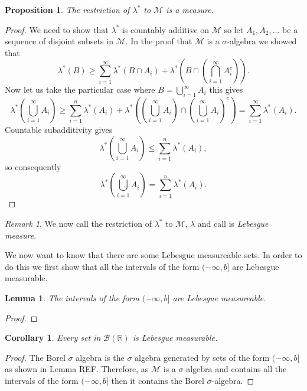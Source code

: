 \documentclass[11pt]{article}
\newtheorem{cor}[thm]{Corollary}
\newtheorem{lem}[thm]{Lemma}
\newtheorem{prp}[thm]{Proposition}
\theoremstyle{definition}
\theoremstyle{remark}
\newtheorem{remark}[thm]{Remark}
\begin{document}
\begin{prp}
The restriction of $\lambda^*$ to $\mathscr{M}$ is a measure. 
\end{prp}
\begin{proof}
We need to show that $\lambda^*$ is countably additive on $\mathscr{M}$ so let $A_1, A_2, \dots$ be a sequence of disjoint subsets in $\mathscr{M}$. In the proof that $\mathscr{M}$ is a $\sigma$-algebra we showed that 
\[ \lambda^*(B) \geq \sum_{i=1}^\infty \lambda^*(B \cap A_i) + \lambda^* \left( B \cap \left( \bigcap_{i=1}^\infty A_i^c \right) \right).  \] Now let us take the particular case where $B = \bigcup_{i=1}^\infty A_i$ this gives
\[ \lambda^* \left( \bigcup_{i=1}^\infty A_i \right) \geq \sum_{i=1}^n \lambda^*(A_i) + \lambda^* \left(\left( \bigcup_{i=1}^\infty A_i \right) \cap \left( \bigcup_{i=1}^\infty A_i \right)^c \right) = \sum_{i=1}^\infty \lambda^* (A_i). \] Countable subadditivity gives
\[ \lambda^* \left( \bigcup_{i=1}^\infty A_i \right) \leq \sum_{i=1}^n \lambda^*(A_i),  \] so consequently
\[ \lambda^* \left( \bigcup_{i=1}^\infty A_i \right) = \sum_{i=1}^n \lambda^*(A_i).  \]
\end{proof}

\begin{remark}
We now call the restriction of $\lambda^*$ to $\mathscr{M}$, $\lambda$ and call is \emph{Lebesgue measure}.
\end{remark}

We now want to know that there are some Lebesgue measureable sets. In order to do this we first show that all the intervals of the form $(-\infty, b]$ are Lebesgue measurable.

\begin{lem}
The intervals of the form $(-\infty, b]$ are Lebesgue measureable.
\end{lem}
\begin{proof}
\end{proof}

\begin{cor}
Every set in $\mathcal{B}(\mathbb{R})$ is Lebesgue measurable.
\end{cor}
\begin{proof}
The Borel $\sigma$ algebra is the $\sigma$ algebra generated by sets of the form $(-\infty, b]$ as shown in Lemma REF. Therefore, as $\mathscr{M}$ is a $\sigma$-algebra and contains all the intervals of the form $(-\infty, b]$ then it contains the Borel $\sigma$-algebra.
\end{proof}
\end{document}
